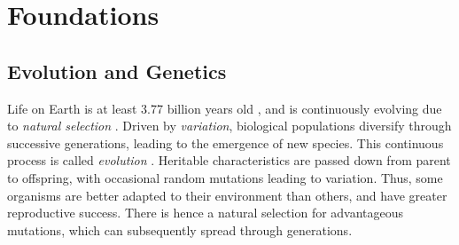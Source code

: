 
\chapter{Foundations}
\label{ch:Foundations}




\section{Evolution and Genetics}
\label{ch:Foundations:sec:EvolutionGenetics}



Life on Earth is at least 3.77 billion years old \cite{Dodd2017},
and is continuously evolving due to \emph{natural selection} \cite{Darwin1859}.
Driven by \emph{variation}, biological populations diversify through successive generations,
leading to the emergence of new species.
This continuous process is called \emph{evolution} \cite{Hall2008}.
Heritable characteristics are passed down from parent to offspring,
with occasional random mutations leading to variation.
Thus, some organisms are better adapted to their environment than others,
and have greater reproductive success.
There is hence a natural selection for advantageous mutations,
which can subsequently spread through generations.

